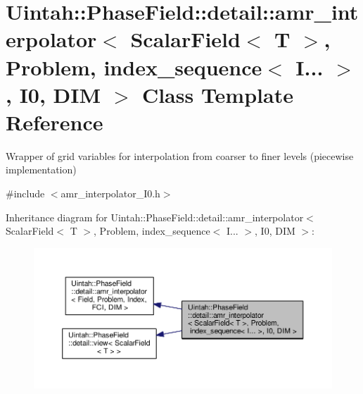 \hypertarget{classUintah_1_1PhaseField_1_1detail_1_1amr__interpolator_3_01ScalarField_3_01T_01_4_00_01Problem64f2458f98b03e27672a091eecc4b696}{}\section{Uintah\+:\+:Phase\+Field\+:\+:detail\+:\+:amr\+\_\+interpolator$<$ Scalar\+Field$<$ T $>$, Problem, index\+\_\+sequence$<$ I... $>$, I0, D\+IM $>$ Class Template Reference}
\label{classUintah_1_1PhaseField_1_1detail_1_1amr__interpolator_3_01ScalarField_3_01T_01_4_00_01Problem64f2458f98b03e27672a091eecc4b696}


Wrapper of grid variables for interpolation from coarser to finer levels (piecewise implementation)  




{\ttfamily \#include $<$amr\+\_\+interpolator\+\_\+\+I0.\+h$>$}



Inheritance diagram for Uintah\+:\+:Phase\+Field\+:\+:detail\+:\+:amr\+\_\+interpolator$<$ Scalar\+Field$<$ T $>$, Problem, index\+\_\+sequence$<$ I... $>$, I0, D\+IM $>$\+:\nopagebreak
\begin{figure}[H]
\begin{center}
\leavevmode
\includegraphics[width=350pt]{classUintah_1_1PhaseField_1_1detail_1_1amr__interpolator_3_01ScalarField_3_01T_01_4_00_01Problem658d7d8430fa7798999c8e5549cf0c0c}
\end{center}
\end{figure}


